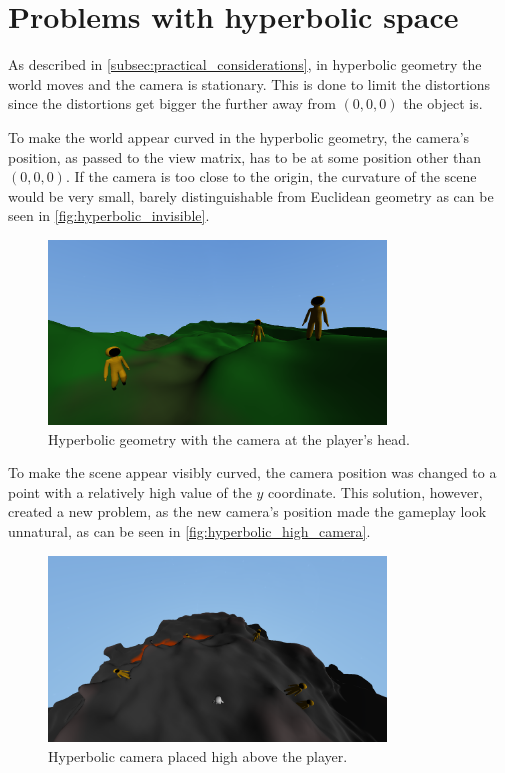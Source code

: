 \section{Problems with hyperbolic space} \label{sec:hyperbolic_problems}
As described in \autoref{subsec:practical_considerations}, in hyperbolic geometry the world moves and the camera is stationary.
This is done to limit the distortions since the distortions get bigger the further away from $(0, 0, 0)$ the object is.

To make the world appear curved in the hyperbolic geometry, the camera's position, as passed to the view matrix, has to be at some position other than $(0, 0, 0)$.
If the camera is too close to the origin, the curvature of the scene would be very small, barely distinguishable from Euclidean geometry as can be seen in \autoref{fig:hyperbolic_invisible}.

\begin{figure}[!htb]
    \centering
    \includegraphics[width=0.8\textwidth]{chapters/problems/resources/hyperbolic-invisible.png}
    \caption{Hyperbolic geometry with the camera at the player's head.}
    \label{fig:hyperbolic_invisible}
\end{figure}

To make the scene appear visibly curved, the camera position was changed to a point with a relatively high value of the $y$ coordinate.
This solution, however, created a new problem, as the new camera's position made the gameplay look unnatural, as can be seen in \autoref{fig:hyperbolic_high_camera}.

\begin{figure}[!htb]
    \centering
    \includegraphics[width=0.8\textwidth]{chapters/problems/resources/hyperbolic-high-camera.png}
    \caption{Hyperbolic camera placed high above the player.}
    \label{fig:hyperbolic_high_camera}
\end{figure}

